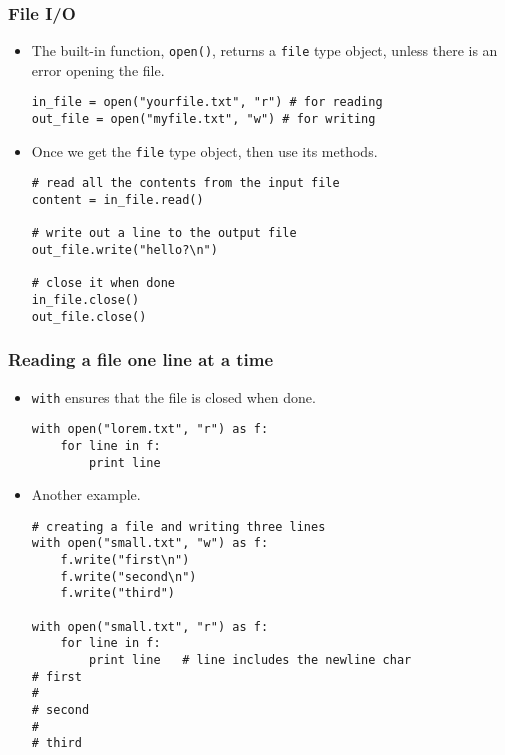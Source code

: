 \documentclass{beamer}
\begin{document}
\begin{frame}[fragile]
\frametitle{File I/O}
\begin{itemize}
\item The built-in function, \lstinline{open()},
      returns a \lstinline{file} type object,
      unless there is an error opening the file.
\begin{lstlisting}
in_file = open("yourfile.txt", "r") # for reading
out_file = open("myfile.txt", "w") # for writing
\end{lstlisting}
\item Once we get the \lstinline{file} type object,
      then use its methods.
\begin{lstlisting}
# read all the contents from the input file
content = in_file.read()

# write out a line to the output file
out_file.write("hello?\n")

# close it when done
in_file.close()
out_file.close()
\end{lstlisting}
\end{itemize}
\end{frame}

\begin{frame}[fragile]
\frametitle{Reading a file one line at a time}
\begin{itemize}
\item \lstinline{with} ensures that the file
      is closed when done.
\begin{lstlisting}
with open("lorem.txt", "r") as f: 
    for line in f:
        print line
\end{lstlisting}
\item Another example.
\begin{lstlisting}
# creating a file and writing three lines
with open("small.txt", "w") as f:
    f.write("first\n")
    f.write("second\n")
    f.write("third")

with open("small.txt", "r") as f:
    for line in f: 
        print line   # line includes the newline char  
# first    
#
# second
#
# third
\end{lstlisting}
\end{itemize}
\end{frame}
\end{document}
